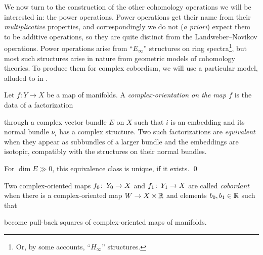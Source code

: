 
We now turn to the construction of the other cohomology operations we will be interested in: the power operations.  Power operations get their name from their \emph{multiplicative} properties, and correspondingly we do not (\textit{a priori}) expect them to be additive operations, so they are quite distinct from the Landweber--Novikov operations.  Power operations arise from ``$E_\infty$'' structures on ring spectra\footnote{Or, by some accounts, ``$H_\infty$'' structures.}, but most such structures arise in nature from geometric models of cohomology theories.  To produce them for complex cobordism, we will use a particular model, alluded to in .


\begin{definition}
Let $f: Y \to X$ be a map of manifolds.  A \textit{complex-orientation on the map $f$} is the data of a factorization
\begin{center}
\end{center}
through a complex vector bundle $E$ on $X$ such that $i$ is an embedding and its normal bundle $\nu_i$ has a complex structure.  Two such factorizations are \textit{equivalent} when they appear as subbundles of a larger bundle and the embeddings are isotopic, compatibly with the structures on their normal bundles.
\end{definition}
\begin{lemma}
For $\dim E \gg 0$, this equivalence class is unique, if it exists. \qed
\end{lemma}
\begin{definition}
Two complex-oriented maps $f_0\colon\thinspace Y_0 \to X$ and $f_1\colon\thinspace Y_1 \to X$ are called \textit{cobordant} when there is a complex-oriented map $W \to X \times \mathbb R$ and elements $b_0, b_1 \in \mathbb R$ such that
\begin{center}
\end{center}
become pull-back squares of complex-oriented maps of manifolds.
\end{definition}

